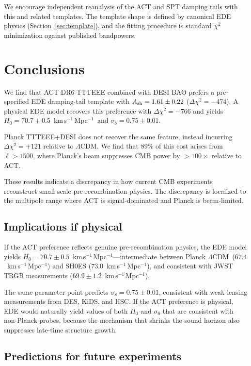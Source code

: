 \documentclass[twocolumn,showpacs,preprintnumbers,amsmath,amssymb,prd]{revtex4-2}
\newcommand{\lcdm}{$\Lambda$CDM}
\newcommand{\kms}{km\,s$^{-1}$\,Mpc$^{-1}$}
\begin{document}
We encourage independent reanalysis of the ACT and SPT damping tails 
with this and related templates. The template shape is defined by 
canonical EDE physics (Section~\ref{sec:template}), and the fitting 
procedure is standard $\chi^2$ minimization against published bandpowers.

\section{Conclusions}
\label{sec:conclusions}

We find that ACT DR6 TTTEEE combined with DESI BAO prefers a pre-specified 
EDE damping-tail template with $A_{\rm sh} = 1.61 \pm 0.22$ 
($\Delta\chi^2 = -474$). A physical EDE model recovers this preference 
with $\Delta\chi^2 = -766$ and yields $H_0 = 70.7 \pm 0.5$~\kms\ and 
$\sigma_8 = 0.75 \pm 0.01$.

Planck TTTEEE+DESI does not recover the same feature, instead incurring 
$\Delta\chi^2 = +121$ relative to \lcdm. We find that 89\% of this cost 
arises from $\ell > 1500$, where Planck's beam suppresses CMB power by 
$>100\times$ relative to ACT.

These results indicate a discrepancy in how current CMB experiments 
reconstruct small-scale pre-recombination physics. The discrepancy 
is localized to the multipole range where ACT is signal-dominated 
and Planck is beam-limited.

\subsection{Implications if physical}

If the ACT preference reflects genuine pre-recombination physics, 
the EDE model yields $H_0 = 70.7 \pm 0.5$~\kms---intermediate between 
Planck \lcdm\ ($67.4$~\kms) and SH0ES ($73.0$~\kms), and consistent 
with JWST TRGB measurements ($69.9 \pm 1.2$~\kms).

The same parameter point predicts $\sigma_8 = 0.75 \pm 0.01$, consistent 
with weak lensing measurements from DES, KiDS, and HSC. If the ACT 
preference is physical, EDE would naturally yield values of both 
$H_0$ and $\sigma_8$ that are consistent with non-Planck probes, 
because the mechanism that shrinks the sound horizon also suppresses 
late-time structure growth.

\subsection{Predictions for future experiments}
\end{document}
